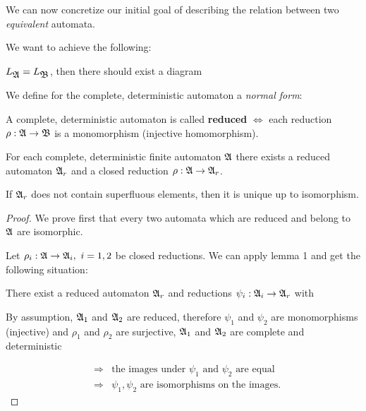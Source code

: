 We can now concretize our initial goal of describing the relation between
two {\em equivalent} automata.

We want to achieve the following:

$L_{\mbox{$\mathfrak{A}$}} = L_{\mbox{$\mathfrak{B}$}}$, then there should exist a diagram

\begin{center}

\end{center}

We define for the complete, deterministic automaton a {\em normal form}:

\begin{definition}
A complete, deterministic automaton is called {\bf reduced} $\iff$ each
reduction $\rho : \mbox{$\mathfrak{A}$} \to \mbox{$\mathfrak{B}$}$ is a monomorphism (injective homomorphism).
\end{definition}

\bigskip
\begin{lemma}
For each complete, deterministic finite automaton $\mbox{$\mathfrak{A}$}$ there exists a
reduced automaton $\mbox{$\mathfrak{A}$}_r$ and a closed reduction $\rho : \mbox{$\mathfrak{A}$} \to
\mbox{$\mathfrak{A}$}_r$.

If $\mbox{$\mathfrak{A}$}_r$ does not contain superfluous elements, then it is unique up to
isomorphism.
\end{lemma}

\begin{proof}
We prove first that every two automata which are reduced and belong to $\mbox{$\mathfrak{A}$}$
are isomorphic.

Let $\rho_i : \mbox{$\mathfrak{A}$} \to \mbox{$\mathfrak{A}$}_i,\ i = 1, 2$ be closed reductions. We can apply
lemma 1 and get the following situation:

There exist a reduced automaton $\mbox{$\mathfrak{A}$}_r$ and reductions $\psi_i : \mbox{$\mathfrak{A}$}_i
\to \mbox{$\mathfrak{A}$}_r$ with

\begin{center}
\end{center}

By assumption, $\mbox{$\mathfrak{A}$}_1$ and $\mbox{$\mathfrak{A}$}_2$ are reduced, therefore $\psi_1$ and
$\psi_2$ are monomorphisms (injective) and $\rho_1$ and $\rho_2$ are surjective,
$\mbox{$\mathfrak{A}$}_1$ and $\mbox{$\mathfrak{A}$}_2$	are complete and deterministic

\begin{eqnarray*}
&\Rightarrow& \text{the images under }\psi_1\text{ and }\psi_2\text{ are
equal}\\
&\Rightarrow& \psi_1, \psi_2\text{ are isomorphisms on the images.} 
\end{eqnarray*}
\end{proof}

